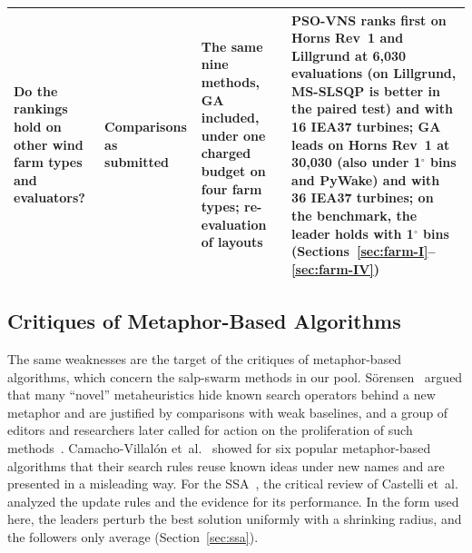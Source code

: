 \begin{table}[!t]
\begin{tabular}{@{}>{\raggedright\arraybackslash}p{}>{\raggedright\arraybackslash}p{}>{\raggedright\arraybackslash}p{}>{\raggedright\arraybackslash}p{}@{}}
Do the rankings hold on other wind farm types and evaluators? & Comparisons as submitted~\cite{Wilson2018,Baker2019,Thomas2023} & The same nine methods, GA included, under one charged budget on four farm types; re-evaluation of layouts & PSO-VNS ranks first on Horns Rev~1 and Lillgrund at 6,030 evaluations (on Lillgrund, MS-SLSQP is better in the paired test) and with 16 IEA37 turbines; GA leads on Horns Rev~1 at 30,030 (also under 1$^\circ$ bins and PyWake) and with 36 IEA37 turbines; on the benchmark, the leader holds with 1$^\circ$ bins (Sections~\ref{sec:farm-I}--\ref{sec:farm-IV}) \\
\bottomrule
\end{tabular}
\end{table}

\subsection{Critiques of Metaphor-Based Algorithms}
\label{sec:related-metaphor}
The same weaknesses are the target of the critiques of metaphor-based algorithms, which concern the salp-swarm methods in our pool. S\"orensen~\cite{Sorensen2015} argued that many ``novel'' metaheuristics hide known search operators behind a new metaphor and are justified by comparisons with weak baselines, and a group of editors and researchers later called for action on the proliferation of such methods~\cite{Aranha2022}. Camacho-Villal\'on et~al.~\cite{CamachoVillalon2023} showed for six popular metaphor-based algorithms that their search rules reuse known ideas under new names and are presented in a misleading way. For the SSA~\cite{Mirjalili2017}, the critical review of Castelli et~al.~\cite{Castelli2022} analyzed the update rules and the evidence for its performance. In the form used here, the leaders perturb the best solution uniformly with a shrinking radius, and the followers only average (Section~\ref{sec:ssa}).

